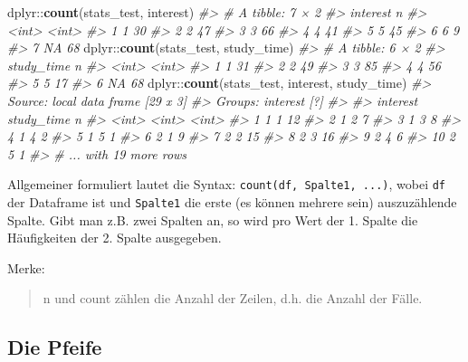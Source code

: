 \documentclass[12pt,]{book}
\newenvironment{Shaded}{\begin{snugshade}}{\end{snugshade}}
\newcommand{\KeywordTok}[1]{\textcolor[rgb]{0.13,0.29,0.53}{\textbf{{#1}}}}
\newcommand{\CommentTok}[1]{\textcolor[rgb]{0.56,0.35,0.01}{\textit{{#1}}}}
\newcommand{\NormalTok}[1]{{#1}}
\begin{document}
\begin{Shaded}
\begin{Highlighting}[]
\NormalTok{dplyr::}\KeywordTok{count}\NormalTok{(stats_test, interest)}
\CommentTok{#> # A tibble: 7 × 2}
\CommentTok{#>   interest     n}
\CommentTok{#>      <int> <int>}
\CommentTok{#> 1        1    30}
\CommentTok{#> 2        2    47}
\CommentTok{#> 3        3    66}
\CommentTok{#> 4        4    41}
\CommentTok{#> 5        5    45}
\CommentTok{#> 6        6     9}
\CommentTok{#> 7       NA    68}
\NormalTok{dplyr::}\KeywordTok{count}\NormalTok{(stats_test, study_time)}
\CommentTok{#> # A tibble: 6 × 2}
\CommentTok{#>   study_time     n}
\CommentTok{#>        <int> <int>}
\CommentTok{#> 1          1    31}
\CommentTok{#> 2          2    49}
\CommentTok{#> 3          3    85}
\CommentTok{#> 4          4    56}
\CommentTok{#> 5          5    17}
\CommentTok{#> 6         NA    68}
\NormalTok{dplyr::}\KeywordTok{count}\NormalTok{(stats_test, interest, study_time)}
\CommentTok{#> Source: local data frame [29 x 3]}
\CommentTok{#> Groups: interest [?]}
\CommentTok{#> }
\CommentTok{#>    interest study_time     n}
\CommentTok{#>       <int>      <int> <int>}
\CommentTok{#> 1         1          1    12}
\CommentTok{#> 2         1          2     7}
\CommentTok{#> 3         1          3     8}
\CommentTok{#> 4         1          4     2}
\CommentTok{#> 5         1          5     1}
\CommentTok{#> 6         2          1     9}
\CommentTok{#> 7         2          2    15}
\CommentTok{#> 8         2          3    16}
\CommentTok{#> 9         2          4     6}
\CommentTok{#> 10        2          5     1}
\CommentTok{#> # ... with 19 more rows}
\end{Highlighting}
\end{Shaded}

Allgemeiner formuliert lautet die Syntax:
\texttt{count(df,\ Spalte1,\ ...)}, wobei \texttt{df} der Dataframe ist
und \texttt{Spalte1} die erste (es können mehrere sein) auszuzählende
Spalte. Gibt man z.B. zwei Spalten an, so wird pro Wert der 1. Spalte
die Häufigkeiten der 2. Spalte ausgegeben.

Merke:

\begin{quote}
n und count zählen die Anzahl der Zeilen, d.h. die Anzahl der Fälle.
\end{quote}

\subsection{Die Pfeife}\label{die-pfeife}
\end{document}
